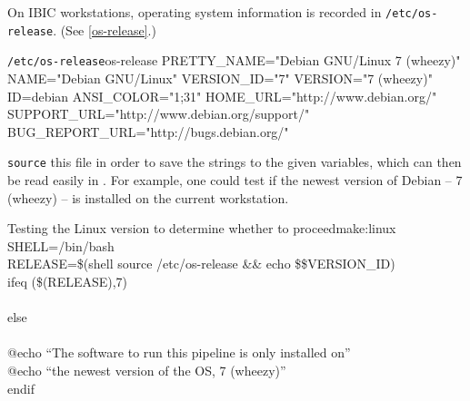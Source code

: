 On IBIC workstations, operating system information is recorded in \texttt{/etc/os-release}. (See \autoref{os-release}.)

\begin{bash}{\texttt{/etc/os-release}}{os-release}
	PRETTY_NAME="Debian GNU/Linux 7 (wheezy)"
	NAME="Debian GNU/Linux"
	VERSION_ID="7"
	VERSION="7 (wheezy)"
	ID=debian
	ANSI_COLOR="1;31"
	HOME_URL="http://www.debian.org/"
	SUPPORT_URL="http://www.debian.org/support/"
	BUG_REPORT_URL="http://bugs.debian.org/"
\end{bash}

\texttt{source} this file in order to save the strings to the given variables, which can then be read easily in \maken{}. For example, one could test if the newest version of Debian -- 7 (wheezy) -- is installed on the current workstation.

\begin{make}{Testing the Linux version to determine whether to proceed}{make:linux}
SHELL=/bin/bash \\
RELEASE=\$(shell source /etc/os-release \&\& echo \$\$VERSION_ID)\\

ifeq (\$(RELEASE),7)\\
\\
else\\
 \\
\tab @echo ``The software to run this pipeline is only installed on'' \\
\tab @echo ``the newest version of the OS, 7 (wheezy)'' \\
endif
\end{make}
